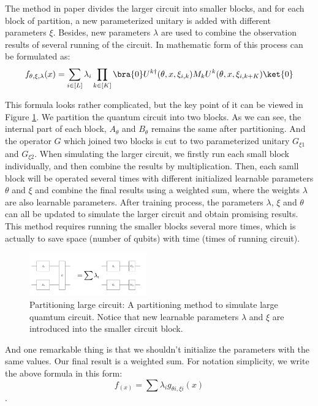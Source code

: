 \documentclass[sigconf]{acmart}
\begin{document}
The method in paper \cite{marshall2022high} divides the larger circuit into smaller blocks, and for each block of partition, a new parameterized unitary is added with different parameters $\xi$. Besides, new parameters $\lambda$ are used to combine the observation results of several running of the circuit. In mathematic form of this process can be formulated as:
$$f_{\theta,\xi,\lambda}(x)=\sum_{i\in [L]}\lambda_i\prod_{k\in [K]}\bra{0}U^{k\dagger}(\theta,x,\xi_{i,k})M_kU^k(\theta,x,\xi_{i,k+K})\ket{0}$$

This formula looks rather complicated, but the key point of it can be viewed in Figure \ref{fig:part}. We partition the quantum circuit into two blocks. As we can see, the internal part of each block, $A_{\theta}$ and $B_{\theta}$ remains the same after partitioning. And the operator $G$ which joined two blocks is cut to two parameterized unitary $G_{\xi 1}$ and $G_{\xi 2}$. When simulating the larger circuit, we firstly run each small block individually, and then combine the results by multiplication. Then, each samll block will be operated several times with different initialized learnable parameters $\theta$ and $\xi$ and combine the final results using a weighted sum, where the weights $\lambda$ are also learnable parameters. After training process, the parameters $\lambda$, $\xi$ and $\theta$ can all be updated to simulate the larger circuit and obtain promising results. This method requires running the smaller blocks several more times, which is actually to save space (number of qubits) with time (times of running circuit).

\begin{figure}[!ht]
	\centering
	\includegraphics[width=0.45\textwidth]{part.png}
	\caption{Partitioning large circuit: {\small \textnormal{A partitioning method to simulate large quamtum circuit. Notice that new learnable parameters $\lambda$ and $\xi$ are introduced into the smaller circuit block.}} }
	\label{fig:part}
\end{figure}

And one remarkable thing is that we shouldn't initialize the parameters with the same values. Our final result is a weighted sum. For notation simplicity, we write the above formula in this form:
$$f_(x)=\sum \lambda_i g_{\theta i, \xi i}(x)$$.
\end{document}
